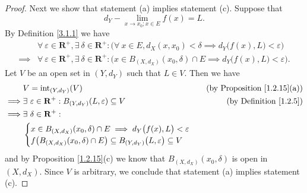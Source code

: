 \begin{proof}
    Next we show that statement (a) implies statement (c).
    Suppose that
    \[
        d_Y - \lim_{x \to x_0 ; x \in E} f(x) = L.
    \]
    By Definition \ref{3.1.1} we have
    \begin{align*}
                 & \forall\ \varepsilon \in \mathbf{R}^+, \exists\ \delta \in \mathbf{R}^+ : \Big(\forall\ x \in E, d_X(x, x_0) < \delta \implies d_Y\big(f(x), L\big) < \varepsilon\Big)  \\
        \implies & \forall\ \varepsilon \in \mathbf{R}^+, \exists\ \delta \in \mathbf{R}^+ : \Big(x \in B_{(X, d_X)}(x_0, \delta) \cap E \implies d_Y\big(f(x), L\big) < \varepsilon\Big).
    \end{align*}
    Let \(V\) be an open set in \((Y, d_Y)\) such that \(L \in V\).
    Then we have
    \begin{align*}
                 & V = \text{int}_{(Y, d_Y)}(V)                                                     & \text{(by Proposition \ref{1.2.15}(a))} \\
        \implies & \exists\ \varepsilon \in \mathbf{R}^+ : B_{(Y, d_Y)}(L, \varepsilon) \subseteq V & \text{(by Definition \ref{1.2.5})}      \\
        \implies & \exists\ \delta \in \mathbf{R}^+ :                                                                                         \\
                 & \begin{cases}
            x \in B_{(X, d_X)}(x_0, \delta) \cap E \implies d_Y\big(f(x), L\big) < \varepsilon \\
            f\big(B_{(X, d_X)}(x_0, \delta) \cap E\big) \subseteq B_{(Y, d_Y)}\big(L, \varepsilon\big) \subseteq V
        \end{cases}
    \end{align*}
    and by Proposition \ref{1.2.15}(c) we know that \(B_{(X, d_X)}(x_0, \delta)\) is open in \((X, d_X)\).
    Since \(V\) is arbitrary, we conclude that statement (a) implies statement (c).


\end{proof}
